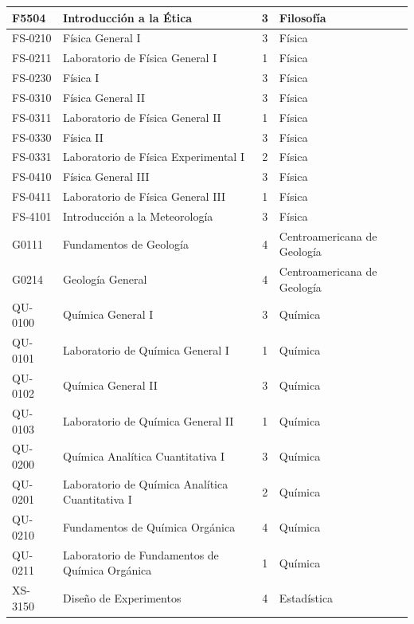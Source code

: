 \begin{longtable}{|l|>{\raggedright\arraybackslash}p{6cm}|c|>{\raggedright\arraybackslash}p{4.2cm}|}
F5504 & Introducción a la Ética & 3 & Filosofía \\ \hline
FS-0210 & Física General I & 3 & Física \\ \hline
FS-0211 & Laboratorio de Física General I & 1 & Física \\ \hline
FS-0230 & Física I & 3 & Física \\ \hline
FS-0310 & Física General II & 3 & Física \\ \hline
FS-0311 & Laboratorio de Física General II & 1 & Física \\ \hline
FS-0330 & Física II & 3 & Física \\ \hline
FS-0331 & Laboratorio de Física Experimental I & 2 & Física \\ \hline
FS-0410 & Física General III & 3 & Física \\ \hline
FS-0411 & Laboratorio de Física General III & 1 & Física \\ \hline
FS-4101 & Introducción a la Meteorología & 3 & Física \\ \hline
G0111 & Fundamentos de Geología & 4 & Centroamericana de Geología \\ \hline
G0214 & Geología General & 4 & Centroamericana de Geología \\ \hline
QU-0100 & Química General I & 3 & Química \\ \hline
QU-0101 & Laboratorio de Química General I & 1 & Química \\ \hline
QU-0102 & Química General II & 3 & Química \\ \hline
QU-0103 & Laboratorio de Química General II & 1 & Química \\ \hline
QU-0200 & Química Analítica Cuantitativa I & 3 & Química \\ \hline
QU-0201 & Laboratorio de Química Analítica Cuantitativa I & 2 & Química \\ \hline
QU-0210 & Fundamentos de Química Orgánica & 4 & Química \\ \hline
QU-0211 & Laboratorio de Fundamentos de Química Orgánica & 1 & Química \\ \hline
XS-3150 & Diseño de Experimentos & 4 & Estadística \\ \hline
\end{longtable}
\endgroup
